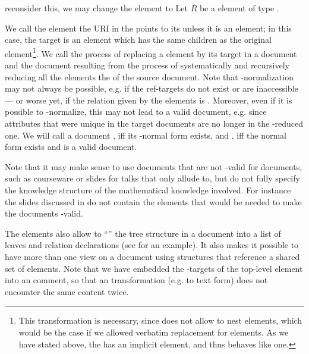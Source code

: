\begin{omgroup}[id=omdoc-infrastructure,short=Document Infrastructure]
\begin{module}[id=sharing]
\begin{omgroup}[id=sharing,short=Sharing Document Parts]
\begin{oldpart}{reconsider this, we may change the  element to
    }
  Let $R$ be a  element of type .
  \begin{definition}[display=flow,id=ref-target.def]
    We call the element the URI in the  points to its
     unless it is an  element; in this case, the
    target is an  element which has the same children as the original
     element\footnote{This transformation is necessary, since \omdoc
      does not allow to nest  elements, which would be the case if we
      allowed verbatim replacement for  elements. As we have stated
      above, the  has an implicit  element, and thus
      behaves like one.}.  We call the process of replacing a  element by
    its target in a document  and the document resulting from the
    process of systematically and recursively reducing all the  elements
    the  of the source document. Note that
    -normalization may not always be possible, e.g.  if the ref-targets do
    not exist or are inaccessible --- or worse yet, if the relation given by the
     elements is {}. Moreover, even if it is possible to
    -normalize, this may not lead to a valid \omdoc document, e.g.  since
     attributes that were unique in the target
    documents are no longer in the -reduced one. We will call a document
    , iff its -normal form exists, and
    , iff the  normal form exists and is a valid \omdoc
    document.
  \end{definition}
\end{oldpart}
  
Note that it may make sense to use documents that are not -valid for
{} documents, such as courseware or slides for talks that
only allude to, but do not fully specify the knowledge structure of the mathematical
knowledge involved. For instance the slides discussed in {}
do not contain the  elements that would be needed to make the documents
-valid.

The  elements also allow to ``{}'' the tree
structure in a document into a list of leaves and relation declarations (see
{} for an example). It also makes it possible to have more than
one view on a document using  structures that reference a
shared set of \omdoc elements. Note that we have embedded the
-targets of the top-level  element into an
 comment, so that an \omdoc transformation (e.g. to text form)
does not encounter the same content twice.


\end{omgroup}
\end{module}
\end{omgroup}
